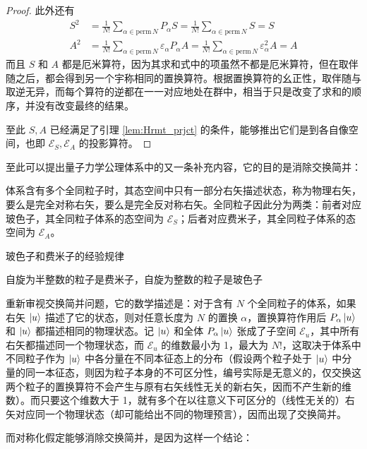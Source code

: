 \documentclass[cn,10pt,math=newtx,citestyle=gb7714-2015,bibstyle=gb7714-2015]{elegantbook}
\def\ms{\mathscr}
\def\ve{\varepsilon}
\begin{document}
\begin{proof}
    此外还有
    \begin{align}
        S^2 &= \frac 1{N!}\sum_{\alpha\in\text{perm}\,N}P_\alpha S = \frac{1}{N!}\sum_{\alpha\in\text{perm}\,N}S = S\\
        A^2 &= \frac 1{N!}\sum_{\alpha\in\text{perm}\,N}\ve_\alpha P_\alpha A = \frac{1}{N!}\sum_{\alpha\in\text{perm}\,N}\ve_\alpha^2A = A
    \end{align}
    而且 $S$ 和 $A$ 都是厄米算符，因为其求和式中的项虽然不都是厄米算符，但在取伴随之后，都会得到另一个宇称相同的置换算符。根据置换算符的幺正性，取伴随与取逆无异，而每个算符的逆都在一一对应地处在群中，相当于只是改变了求和的顺序，并没有改变最终的结果。
    
    至此 $S,A$ 已经满足了引理 \ref{lem:Hrmt_prjct} 的条件，能够推出它们是到各自像空间，也即 $\ms E_S,\ms E_A$ 的投影算符。
\end{proof}

至此可以提出量子力学公理体系中的又一条补充内容，它的目的是消除交换简并：

\begin{postulate}[对称化假定]
    体系含有多个全同粒子时，其态空间中只有一部分右矢描述状态，称为物理右矢，要么是完全对称右矢，要么是完全反对称右矢。全同粒子因此分为两类：前者对应玻色子，其全同粒子体系的态空间为 $\ms E_S$；后者对应费米子，其全同粒子体系的态空间为 $\ms E_A$。
\end{postulate}

\begin{assumption} 玻色子和费米子的经验规律 

自旋为半整数的粒子是费米子，自旋为整数的粒子是玻色子
\end{assumption}

重新审视交换简并问题，它的数学描述是：对于含有 $N$ 个全同粒子的体系，如果右矢 $\ket{u}$ 描述了它的状态，则对任意长度为 $N$ 的置换 $\alpha$，置换算符作用后 $P_\alpha\ket{u}$ 和 $\ket{u}$ 都描述相同的物理状态。记 $\ket{u}$ 和全体 $P_\alpha\ket{u}$ 张成了子空间 $\ms E_u$，其中所有右矢都描述同一个物理状态，而 $\ms E_u$ 的维数最小为 1，最大为 $N!$，这取决于体系中不同粒子作为 $\ket{u}$ 中各分量在不同本征态上的分布（假设两个粒子处于 $\ket{u}$ 中分量的同一本征态，则因为粒子本身的不可区分性，编号实际是无意义的，仅交换这两个粒子的置换算符不会产生与原有右矢线性无关的新右矢，因而不产生新的维数）。而只要这个维数大于 1，就有多个在以往意义下可区分的（线性无关的）右矢对应同一个物理状态（却可能给出不同的物理预言），因而出现了交换简并。

而对称化假定能够消除交换简并，是因为这样一个结论：
\end{document}
